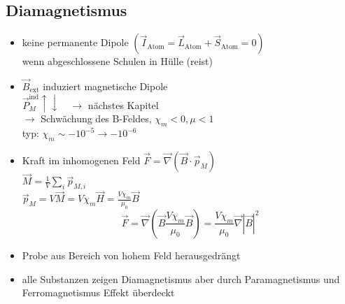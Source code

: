 \documentclass[titlepage,12pt,a4paper,ngerman]{report}
\newcommand{\tx}[1]{\textrm{#1}}
\begin{document}
\subsection{Diamagnetismus}
\begin{itemize}
	\item keine permanente Dipole $ (\vec{I}_{\tx{Atom}} = \vec{L}_{\tx{Atom}} + \vec{S}_{\tx{Atom}} = 0 )$\\
	wenn abgeschlossene Schulen in Hülle (reist)
	\item $ \vec{B}_{\tx{ext}} $ induziert magnetische Dipole\\
	$ \vec{P}^{\tx{ind}}_M \uparrow \downarrow \quad \rightarrow $ nächstes Kapitel\\
	$ \rightarrow $ Schwächung des B-Feldes, $ \chi_m < 0, \mu < 1 $\\
	typ: $ \chi_m \sim - 10 ^{-5} \rightarrow -10^{-6} $
	\item Kraft im inhomogenen Feld $ \vec{F} = \vec{\nabla} (\vec{B} \cdot \vec{p}_M) $\\
	$ \vec{M} = \frac{1}{V} \sum_i \vec{p}_{M,i} $\\
	$ \vec{p}_M = V \vec{M} = V \chi_m \vec{H} = \frac{V \chi_m}{\mu_0} \vec{B}$\\
	$$ \vec{F} = \vec{\nabla}(\vec{B} \frac{V \chi_m}{\mu_0} \vec{B}) = \frac{V \chi_m}{\mu_0} \vec{\nabla} |\vec{B}|^2$$
	\item  Probe aus Bereich von hohem Feld herausgedrängt
	\item alle Substanzen zeigen Diamagnetismus aber durch Paramagnetismus und  Ferromagnetismus Effekt überdeckt
\end{itemize}
\end{document}
